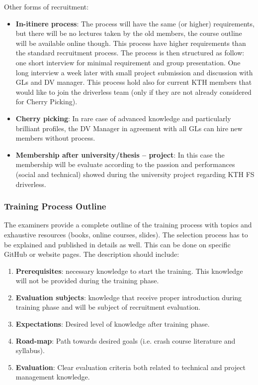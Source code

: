 \documentclass[graybox]{svmult}
\begin{document}
Other forms of recruitment:
\begin{itemize}
\item \textbf{In-itinere process}:
The process will have the same (or higher) requirements, but there will be no lectures taken by the old members, the course outline will be available online though. This process have higher requirements than the standard recruitment process. The process is then structured as follow: one short interview for minimal requirement and group presentation. One long interview a week later with small project submission and discussion with GLs and DV manager.
This process hold also for current KTH members that would like to join the driverless team (only if they are not already considered for Cherry Picking).

\item \textbf{Cherry picking}:
In rare case of advanced knowledge and particularly brilliant profiles, the DV Manager in agreement with all GLs can hire new members without process.

\item \textbf{Membership after university/thesis – project}:
In this case the membership will be evaluate according to the passion and performances (social and technical) showed during the university project regarding KTH FS driverless.
\end{itemize}

\subsubsection{Training Process Outline}
The examiners provide a complete outline of the training process with topics and exhaustive resources (books, online courses, slides). The selection process has to be explained and published in details as well. This can be done on specific GitHub or website pages.
The description should include:
\begin{enumerate}
\item \textbf{Prerequisites}: necessary knowledge to start the training. This knowledge will not be provided during the training phase.
\item \textbf{Evaluation subjects}: knowledge that receive proper introduction during training phase and will be subject of recruitment evaluation.
\item \textbf{Expectations}: Desired level of knowledge after training phase.
\item \textbf{Road-map}: Path towards desired goals (i.e. crash course literature and syllabus).
\item \textbf{Evaluation}: Clear evaluation criteria both related to technical and project management knowledge.
\end{enumerate}
\end{document}
